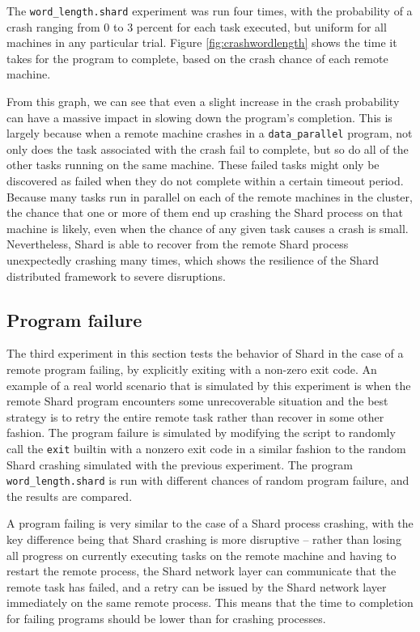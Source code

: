 \documentclass[twoside]{report}
\begin{document}
The \texttt{word\_length.shard} experiment was run four times, with the probability of a crash ranging from 0 to 3 percent for each task executed, but uniform for all machines in any particular trial.
Figure \ref{fig:crashwordlength} shows the time it takes for the program to complete, based on the crash chance of each remote machine.

From this graph, we can see that even a slight increase in the crash probability can have a massive impact in slowing down the program's completion.
This is largely because when a remote machine crashes in a \texttt{data\_parallel} program, not only does the task associated with the crash fail to complete, but so do all of the other tasks running on the same machine.
These failed tasks might only be discovered as failed when they do not complete within a certain timeout period.
Because many tasks run in parallel on each of the remote machines in the cluster, the chance that one or more of them end up crashing the Shard process on that machine is likely, even when the chance of any given task causes a crash is small.
Nevertheless, Shard is able to recover from the remote Shard process unexpectedly crashing many times, which shows the resilience of the Shard distributed framework to severe disruptions.

\subsection{Program failure}
The third experiment in this section tests the behavior of Shard in the case of a remote program failing, by explicitly exiting with a non-zero exit code.
An example of a real world scenario that is simulated by this experiment is when the remote Shard program encounters some unrecoverable situation and the best strategy is to retry the entire remote task rather than recover in some other fashion.
The program failure is simulated by modifying the script to randomly call the \texttt{exit} builtin with a nonzero exit code in a similar fashion to the random Shard crashing simulated with the previous experiment.
The program \texttt{word\_length.shard} is run with different chances of random program failure, and the results are compared.

A program failing is very similar to the case of a Shard process crashing, with the key difference being that Shard crashing is more disruptive -- rather than losing all progress on currently executing tasks on the remote machine and having to restart the remote process, the Shard network layer can communicate that the remote task has failed, and a retry can be issued by the Shard network layer immediately on the same remote process.
This means that the time to completion for failing programs should be lower than for crashing processes.
\end{document}
